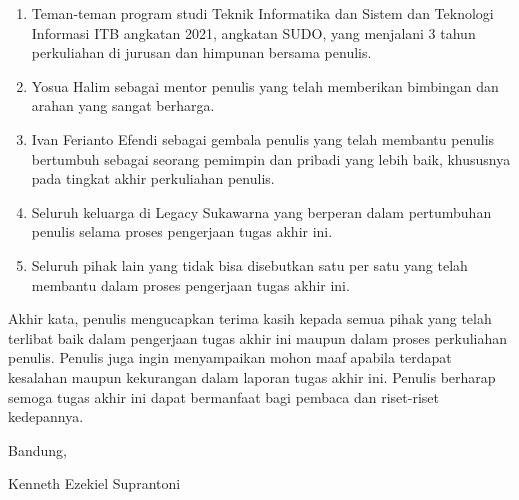 \begin{enumerate}
	\item Teman-teman program studi Teknik Informatika dan Sistem dan Teknologi Informasi ITB angkatan 2021, angkatan SUDO, yang menjalani 3 tahun perkuliahan di jurusan dan himpunan bersama penulis.
	\item Yosua Halim sebagai mentor penulis yang telah memberikan bimbingan dan arahan yang sangat berharga.
	\item Ivan Ferianto Efendi sebagai gembala penulis yang telah membantu penulis bertumbuh sebagai seorang pemimpin dan pribadi yang lebih baik, khususnya pada tingkat akhir perkuliahan penulis.
	\item Seluruh keluarga di Legacy Sukawarna yang berperan dalam pertumbuhan penulis selama proses pengerjaan tugas akhir ini.
	\item Seluruh pihak lain yang tidak bisa disebutkan satu per satu yang telah membantu dalam proses pengerjaan tugas akhir ini.
\end{enumerate}

Akhir kata, penulis mengucapkan terima kasih kepada semua pihak yang telah terlibat baik dalam pengerjaan tugas akhir ini maupun dalam proses perkuliahan penulis. Penulis juga ingin menyampaikan mohon maaf apabila terdapat kesalahan maupun kekurangan dalam laporan tugas akhir ini. Penulis berharap semoga tugas akhir ini dapat bermanfaat bagi pembaca dan riset-riset kedepannya.


\begin{flushright}
	\vspace{0.5cm}
	Bandung, \tanggalpengesahan

	\vspace{1.5cm}

	Kenneth Ezekiel Suprantoni
\end{flushright}

